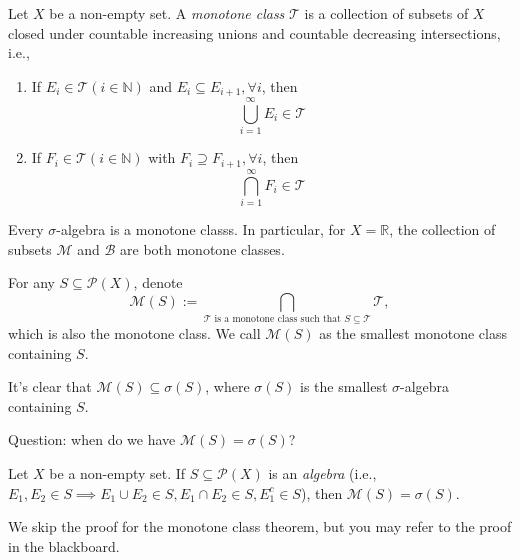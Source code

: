 \begin{definition}
Let $X$ be a non-empty set.
A \emph{monotone class} $\mathcal{T}$ is a collection of subsets of $X$ closed under countable increasing unions and countable decreasing intersections, i.e., 
\begin{enumerate}
\item
If $E_i\in\mathcal{T} (i\in\mathbb{N})$ and $E_i\subseteq E_{i+1},\forall i$, then
\[
\bigcup_{i=1}^\infty E_i\in\mathcal{T}
\]
\item
If $F_i\in\mathcal{T} (i\in\mathbb{N})$ with $F_i\supseteq F_{i+1},\forall i$, then
\[
\bigcap_{i=1}^\infty F_i\in\mathcal{T}
\]
\end{enumerate}
\end{definition}
\begin{remark}
Every $\sigma$-algebra is a monotone classs.
In particular, for $X=\mathbb{R}$, the collection of subsets $\mathcal{M}$ and $\mathcal{B}$ are both monotone classes.
\end{remark}


\begin{definition}
For any $S\subseteq\mathcal{P}(X)$, denote
\[
\mathcal{M}(S):=\bigcap_{\text{$\mathcal{T}$ is a monotone class such that $S\subseteq\mathcal{T}$}}\mathcal{T},
\]
which is also the monotone class.
We call $\mathcal{M}(S)$ as the smallest monotone class containing $S$.
\end{definition}
\begin{remark}
It's clear that $\mathcal{M}(S)\subseteq\sigma(S)$, where $\sigma(S)$ is the smallest $\sigma$-algebra containing $S$.

Question: when do we have $\mathcal{M}(S)=\sigma(S)$?
\end{remark}


\begin{theorem}
Let $X$ be a non-empty set.
If $S\subseteq\mathcal{P}(X)$ is an \emph{algebra} (i.e., $E_1,E_2\in S\implies E_1\cup E_2\in S,E_1\cap E_2\in S,E_1^c\in S$), then 
$\mathcal{M}(S)=\sigma(S)$.
\end{theorem}
We skip the proof for the monotone class theorem, but you may refer to the proof in the blackboard.


